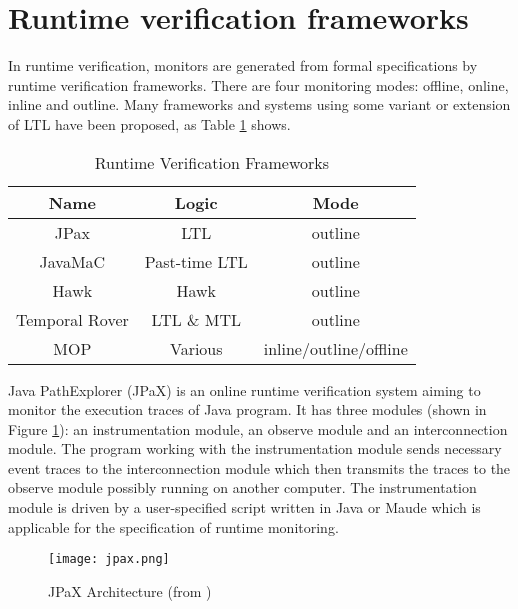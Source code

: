 \section{Runtime verification frameworks}\label{sec:rv:frameworks}

In runtime verification, monitors are generated from formal specifications by runtime verification frameworks. There are four monitoring modes: offline, online, inline and outline. Many frameworks and systems using some variant or extension of LTL have been proposed, as Table \ref{table:rvframeworks} shows. 

\begin{table}[h]
\centering
\begin{tabular}{|c|c|c|}
\hline
Name & Logic & Mode \\
\hline
JPax\citep{havelund2001java} & LTL & outline \\
\hline
JavaMaC\citep{kim2004java} & Past-time LTL & outline \\
\hline
Hawk \citep{d2005event} & Hawk & outline \\
\hline
Temporal Rover\citep{drusinsky2000temporal} & LTL \& MTL & outline \\
\hline
MOP \citep{chen2007mop} & Various & inline/outline/offline \\
\hline
\end{tabular}
\caption{Runtime Verification Frameworks}
\label{table:rvframeworks}
\end{table}

Java PathExplorer (JPaX) \citep{havelund2001java} is an online runtime verification system aiming to monitor the execution traces of Java program. It has three modules (shown in Figure \ref{img:jpax}): an instrumentation module, an observe module and an interconnection module. The program working with the instrumentation module sends necessary event traces to the interconnection module which then transmits the traces to the observe module possibly running on another computer. The instrumentation module is driven by a user-specified script written in Java or Maude which is applicable for the specification of runtime monitoring.

\begin{figure}[h]
\begin{center}
\centering
\texttt{[image: jpax.png]}
\caption{JPaX Architecture (from \cite{havelund2001java})}
\label{img:jpax}
\end{center}
\end{figure}

